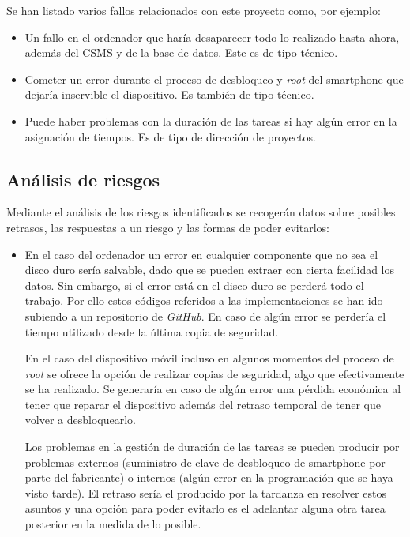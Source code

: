 \documentclass[12pt,a4paper,onecolumn,oneside]{report}
\begin{document}
Se han listado varios fallos relacionados con este proyecto como, por ejemplo:

\begin{itemize}
\item Un fallo en el ordenador que haría desaparecer todo lo realizado hasta ahora, además del CSMS y de la base de datos. Este es de tipo técnico.
\item Cometer un error durante el proceso de desbloqueo y \textit{root} del smartphone que dejaría inservible el dispositivo. Es también de tipo técnico.
\item Puede haber problemas con la duración de las tareas si hay algún error en la asignación de tiempos. Es de tipo de dirección de proyectos.
\end{itemize}

\subsection{Análisis de riesgos}

Mediante el análisis de los riesgos identificados se recogerán datos sobre posibles retrasos, las respuestas a un riesgo y las formas de poder evitarlos:

\begin{itemize}
\item En el caso del ordenador un error en cualquier componente que no sea el disco duro sería salvable, dado que se pueden extraer con cierta facilidad los datos. Sin embargo, si el error está en el disco duro se perderá todo el trabajo. Por ello estos códigos referidos a las implementaciones se han ido subiendo a un repositorio de \textit{GitHub}. En caso de algún error se perdería el tiempo utilizado desde la última copia de seguridad.

En el caso del dispositivo móvil incluso en algunos momentos del proceso de \textit{root} se ofrece la opción de realizar copias de seguridad, algo que efectivamente se ha realizado. Se generaría en caso de algún error una pérdida económica al tener que reparar el dispositivo además del retraso temporal de tener que volver a desbloquearlo.

Los problemas en la gestión de duración de las tareas se pueden producir por problemas externos (suministro de clave de desbloqueo de smartphone por parte del fabricante) o internos (algún error en la programación que se haya visto tarde). El retraso sería el producido por la tardanza en resolver estos asuntos y una opción para poder evitarlo es el adelantar alguna otra tarea posterior en la medida de lo posible.

\end{itemize}
\end{document}
